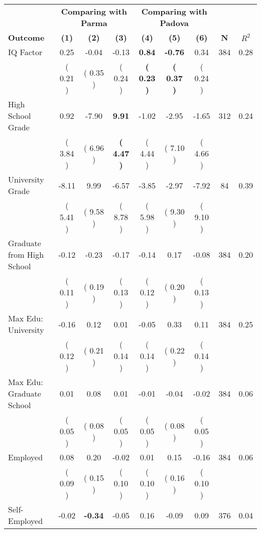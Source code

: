 \begin{tabular}{lcccccccc}
\toprule
 & \multicolumn{3}{c}{\textbf{Comparing with Parma}} & \multicolumn{3}{c}{\textbf{Comparing with Padova}} & \\
\cmidrule(lr){2-4} \cmidrule(lr){5-7} 
 \textbf{Outcome} & \textbf{(1)} & \textbf{(2)} & \textbf{(3)} & \textbf{(4)} & \textbf{(5)} & \textbf{(6)} & \textbf{N} & \textbf{$ R^2$} \\
\midrule
IQ Factor &      0.25 &     -0.04 &     -0.13 & \textbf{     0.84} & \textbf{    -0.76} &      0.34 & 384 &       0.28 \\ 
 & (     0.21 ) & (     0.35 ) & (     0.24 ) & \textbf{(     0.23 )} & \textbf{(     0.37 )} & (     0.24 ) & \\
High School Grade &      0.92 &     -7.90 & \textbf{     9.91} &     -1.02 &     -2.95 &     -1.65 & 312 &       0.24 \\ 
 & (     3.84 ) & (     6.96 ) & \textbf{(     4.47 )} & (     4.44 ) & (     7.10 ) & (     4.66 ) & \\
University Grade &     -8.11 &      9.99 &     -6.57 &     -3.85 &     -2.97 &     -7.92 & 84 &       0.39 \\ 
 & (     5.41 ) & (     9.58 ) & (     8.78 ) & (     5.98 ) & (     9.30 ) & (     9.10 ) & \\
Graduate from High School &     -0.12 &     -0.23 &     -0.17 &     -0.14 &      0.17 &     -0.08 & 384 &       0.20 \\ 
 & (     0.11 ) & (     0.19 ) & (     0.13 ) & (     0.12 ) & (     0.20 ) & (     0.13 ) & \\
Max Edu: University &     -0.16 &      0.12 &      0.01 &     -0.05 &      0.33 &      0.11 & 384 &       0.25 \\ 
 & (     0.12 ) & (     0.21 ) & (     0.14 ) & (     0.14 ) & (     0.22 ) & (     0.14 ) & \\
Max Edu: Graduate School &      0.01 &      0.08 &      0.01 &     -0.01 &     -0.04 &     -0.02 & 384 &       0.06 \\ 
 & (     0.05 ) & (     0.08 ) & (     0.05 ) & (     0.05 ) & (     0.08 ) & (     0.05 ) & \\
Employed &      0.08 &      0.20 &     -0.02 &      0.01 &      0.15 &     -0.16 & 384 &       0.06 \\ 
 & (     0.09 ) & (     0.15 ) & (     0.10 ) & (     0.10 ) & (     0.16 ) & (     0.10 ) & \\
Self-Employed &     -0.02 & \textbf{    -0.34} &     -0.05 &      0.16 &     -0.09 &      0.09 & 376 &       0.04 \\ 

\end{tabular}
